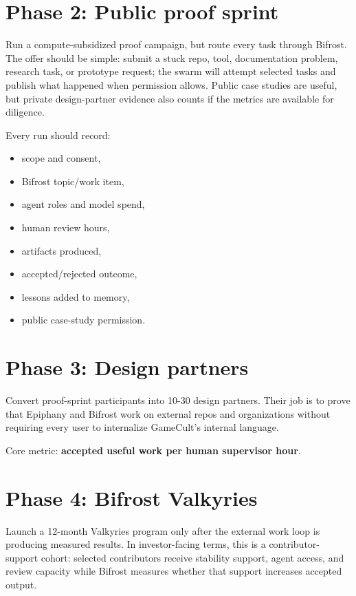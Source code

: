 \documentclass[11pt,oneside]{report}
\newcommand{\term}[1]{\textbf{#1}}
\begin{document}
\section{Phase 2: Public proof sprint}

Run a compute-subsidized proof campaign, but route every task through Bifrost. The offer should be simple: submit a stuck repo, tool, documentation problem, research task, or prototype request; the swarm will attempt selected tasks and publish what happened when permission allows. Public case studies are useful, but private design-partner evidence also counts if the metrics are available for diligence.

Every run should record:

\begin{itemize}
  \item scope and consent,
  \item Bifrost topic/work item,
  \item agent roles and model spend,
  \item human review hours,
  \item artifacts produced,
  \item accepted/rejected outcome,
  \item lessons added to memory,
  \item public case-study permission.
\end{itemize}

\section{Phase 3: Design partners}

Convert proof-sprint participants into 10-30 design partners. Their job is to prove that Epiphany and Bifrost work on external repos and organizations without requiring every user to internalize GameCult's internal language.

Core metric: \term{accepted useful work per human supervisor hour}.

\section{Phase 4: Bifrost Valkyries}

Launch a 12-month Valkyries program only after the external work loop is producing measured results. In investor-facing terms, this is a contributor-support cohort: selected contributors receive stability support, agent access, and review capacity while Bifrost measures whether that support increases accepted output.
\end{document}

